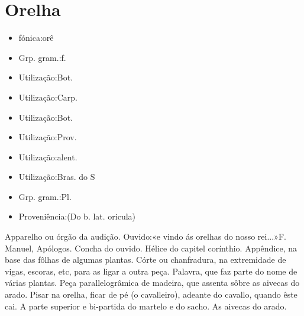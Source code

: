 \section{Orelha}
\begin{itemize}
\item {fónica:orê}
\end{itemize}
\begin{itemize}
\item {Grp. gram.:f.}
\end{itemize}
\begin{itemize}
\item {Utilização:Bot.}
\end{itemize}
\begin{itemize}
\item {Utilização:Carp.}
\end{itemize}
\begin{itemize}
\item {Utilização:Bot.}
\end{itemize}
\begin{itemize}
\item {Utilização:Prov.}
\end{itemize}
\begin{itemize}
\item {Utilização:alent.}
\end{itemize}
\begin{itemize}
\item {Utilização:Bras. do S}
\end{itemize}
\begin{itemize}
\item {Grp. gram.:Pl.}
\end{itemize}
\begin{itemize}
\item {Proveniência:(Do b. lat. \textunderscore oricula\textunderscore )}
\end{itemize}
Apparelho ou órgão da audição.
Ouvido:«\textunderscore e vindo ás orelhas do nosso rei...\textunderscore »F. Manuel, \textunderscore Apólogos\textunderscore .
Concha do ouvido.
Hélice do capitel corínthio.
Appêndice, na base das fôlhas de algumas plantas.
Córte ou chanfradura, na extremidade de vigas, escoras, etc, para as ligar a outra peça.
Palavra, que faz parte do nome de várias plantas.
Peça parallelogrâmica de madeira, que assenta sôbre as aivecas do arado.
\textunderscore Pisar na orelha\textunderscore , ficar de pé (o cavalleiro), adeante do cavallo, quando êste cai.
A parte superior e bi-partida do martelo e do sacho.
As aivecas do arado.
